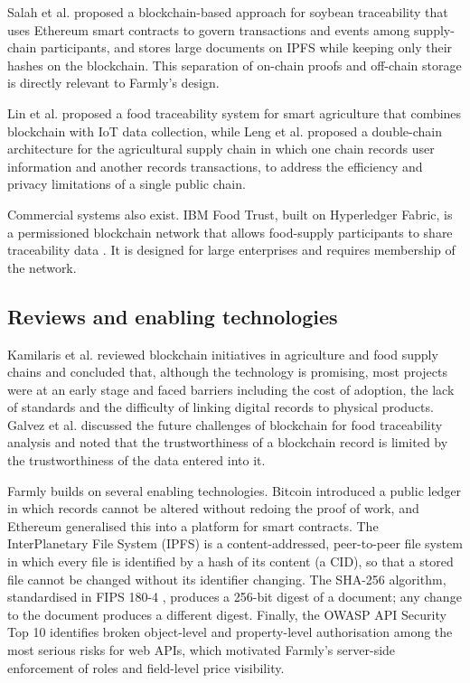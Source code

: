 Salah et al. \cite{salah2019} proposed a blockchain-based approach for soybean traceability that uses Ethereum smart contracts to govern transactions and events among supply-chain participants, and stores large documents on IPFS while keeping only their hashes on the blockchain. This separation of on-chain proofs and off-chain storage is directly relevant to Farmly's design.

Lin et al. \cite{lin2018} proposed a food traceability system for smart agriculture that combines blockchain with IoT data collection, while Leng et al. \cite{leng2018} proposed a double-chain architecture for the agricultural supply chain in which one chain records user information and another records transactions, to address the efficiency and privacy limitations of a single public chain.

Commercial systems also exist. IBM Food Trust, built on Hyperledger Fabric, is a permissioned blockchain network that allows food-supply participants to share traceability data \cite{ibmfoodtrust}. It is designed for large enterprises and requires membership of the network.

\subsection*{Reviews and enabling technologies}
Kamilaris et al. \cite{kamilaris2019} reviewed blockchain initiatives in agriculture and food supply chains and concluded that, although the technology is promising, most projects were at an early stage and faced barriers including the cost of adoption, the lack of standards and the difficulty of linking digital records to physical products. Galvez et al. \cite{galvez2018} discussed the future challenges of blockchain for food traceability analysis and noted that the trustworthiness of a blockchain record is limited by the trustworthiness of the data entered into it.

Farmly builds on several enabling technologies. Bitcoin \cite{nakamoto2008} introduced a public ledger in which records cannot be altered without redoing the proof of work, and Ethereum \cite{wood2014} generalised this into a platform for smart contracts. The InterPlanetary File System (IPFS) \cite{benet2014} is a content-addressed, peer-to-peer file system in which every file is identified by a hash of its content (a CID), so that a stored file cannot be changed without its identifier changing. The SHA-256 algorithm, standardised in FIPS 180-4 \cite{fips180}, produces a 256-bit digest of a document; any change to the document produces a different digest. Finally, the OWASP API Security Top 10 \cite{owasp2023} identifies broken object-level and property-level authorisation among the most serious risks for web APIs, which motivated Farmly's server-side enforcement of roles and field-level price visibility.

